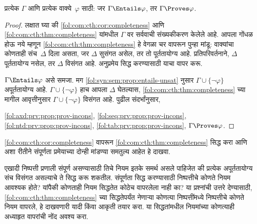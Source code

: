 \begin{cor}[संपूर्णता प्रमेय, दुसरी आवृत्ती]
\label{fol:com:cth:cor:completeness}
प्रत्येक $\Gamma$ आणि प्रत्येक वाक्ये~$\varphi$ साठी: जर
$\Gamma \Entails \varphi$, तर $\Gamma \Proves \varphi$.
\end{cor}

\begin{proof}
लक्षात घ्या की \ref{fol:com:cth:cor:completeness} आणि
\ref{fol:com:cth:thm:completeness} यांमधील $\Gamma$ वर सर्ववाची संख्यकीकरण केलेले
आहे. आपला गोंधळ होऊ नये म्हणून \ref{fol:com:cth:thm:completeness} हे वेगळा चर
वापरून पुन्हा मांडू: वाक्यांचा कोणताही संच~$\Delta$ दिला असता,
जर $\Delta$ सुसंगत असेल, तर तो पूर्ततायोग्य आहे. प्रतिपरिवर्तनाने,
$\Delta$ पूर्ततायोग्य नसेल, तर $\Delta$ विसंगत आहे. अनुप्रमेय सिद्ध
करण्यासाठी याचा वापर करू.

$\Gamma \Entails \varphi$ असे समजा. मग \ref{fol:syn:sem:prop:entails-unsat}
नुसार $\Gamma \cup \{\lnot \varphi\}$ अपूर्ततायोग्य आहे. $\Gamma \cup
\{\lnot \varphi\}$ हाच आपला $\Delta$ घेतल्यास,
\ref{fol:com:cth:thm:completeness} च्या मागील आवृत्तीनुसार $\Gamma \cup
\{\lnot \varphi\}$ विसंगत आहे. पुढील संदर्भांनुसार,

  \ref{fol:axd:prv:prop:prov-incons}, \ref{fol:seq:prv:prop:prov-incons}, \ref{fol:ntd:prv:prop:prov-incons}, \ref{fol:tab:prv:prop:prov-incons},
$\Gamma \Proves \varphi$.
\end{proof}


\begin{prob}
\ref{fol:com:cth:cor:completeness} वापरून
\ref{fol:com:cth:thm:completeness} सिद्ध करा आणि अशा रीतीने
संपूर्णता प्रमेयाच्या दोन्ही मांडण्या समतुल्य आहेत हे दाखवा.
\end{prob}





\begin{prob}
एखादी निष्पत्ती प्रणाली संपूर्ण असण्यासाठी तिचे नियम इतके समर्थ
असले पाहिजेत की प्रत्येक अपूर्ततायोग्य संच विसंगत असल्याचे ते सिद्ध करू
शकतील. संपूर्णता सिद्ध करण्यासाठी निष्पत्तीचे कोणते नियम आवश्यक
होते? यांपैकी कोणताही नियम सिद्धतेत कोठेच वापरलेला नाही का? या प्रश्नांची
उत्तरे देण्यासाठी, \ref{fol:com:cth:thm:completeness} च्या सिद्धतेपर्यंत
नेणाऱ्या कोणत्या निष्पत्तींमध्ये निष्पत्तीचे कोणते नियम वापरले, हे
दाखवणारी यादी किंवा आकृती तयार करा. या सिद्धतांमधील नियमांच्या कोणत्याही
अध्याहृत वापरांची नोंद अवश्य करा.
\end{prob}















